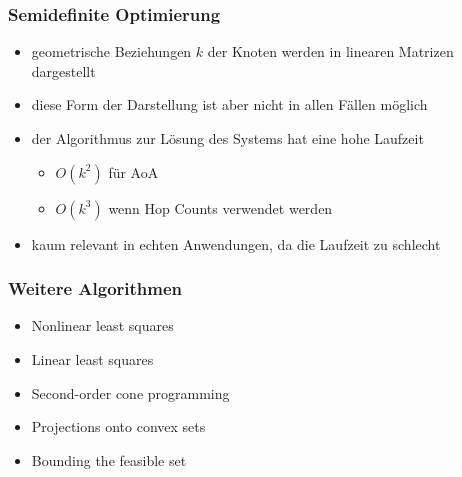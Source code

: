 \begin{frame}
  \frametitle{Semidefinite Optimierung}

  \begin{itemize}
  \item geometrische Beziehungen $k$ der Knoten werden in linearen Matrizen
    dargestellt
  \item diese Form der Darstellung ist aber nicht in allen Fällen
    möglich
  \item der Algorithmus zur Lösung des Systems hat eine hohe Laufzeit
    \begin{itemize}
    \item $O(k^2)$ für AoA
    \item $O(k^3)$ wenn Hop Counts verwendet werden
    \end{itemize}
  \item kaum relevant in echten Anwendungen, da die Laufzeit zu
    schlecht
  \end{itemize}
\end{frame}

\begin{frame}
  \frametitle{Weitere Algorithmen}

  \begin{itemize}
  \item Nonlinear least squares
  \item Linear least squares
  \item Second-order cone programming
  \item Projections onto convex sets
  \item Bounding the feasible set
  \end{itemize}
\end{frame}